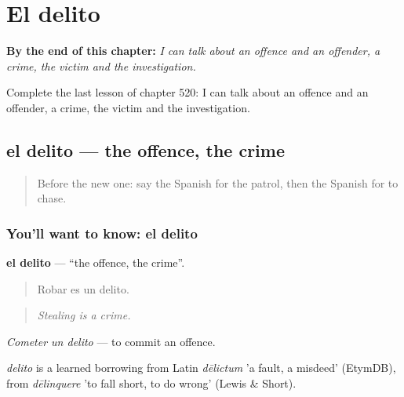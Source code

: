 
\chapter{El delito}
\label{ch:es-el-delito}

\begin{chapteropening}
\textbf{By the end of this chapter:} \emph{I can talk about an offence and an offender, a crime, the victim and the investigation.}

Complete the last lesson of chapter 520: I can talk about an offence and an offender, a crime, the victim and the investigation.
\end{chapteropening}

\section[el delito]{el delito — the offence, the crime}

\label{lesson:ES-C520-delito}



\begin{quote}
Before the new one: say the Spanish for the patrol, then the Spanish for to chase.
\end{quote}

\subsection*{You'll want to know: el delito}
\textbf{el delito} — \textquotedblleft{}the offence, the crime\textquotedblright{}.

\begin{quote}
Robar es un delito.
\end{quote}

\begin{quote}
\emph{Stealing is a crime.}
\end{quote}

\emph{Cometer un delito} — to commit an offence.

\begin{cousinweb}
\emph{delito} is a learned borrowing from Latin \emph{dēlictum} 'a fault, a misdeed' (EtymDB), from \emph{dēlinquere} 'to fall short, to do wrong' (Lewis \& Short).
\end{cousinweb}

